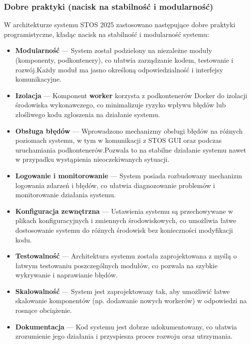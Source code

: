 \documentclass[12pt,a4paper]{article}
\begin{document}
\subsubsection{Dobre praktyki (nacisk na stabilność i modularność)}
W architekturze systemu STOS 2025 zastosowano następujące dobre praktyki programistyczne, kładąc nacisk na stabilność i modularność systemu:
\begin{itemize}
    \item \textbf{Modularność} --- System został podzielony na niezależne moduły (komponenty, podkontenery), co ułatwia zarządzanie kodem, testowanie i rozwój.\@ Każdy moduł ma jasno określoną odpowiedzialność i interfejsy komunikacyjne.
    \item \textbf{Izolacja} --- Komponent \textbf{worker} korzysta z podkontenerów Docker do izolacji środowiska wykonawczego, co minimalizuje ryzyko wpływu błędów lub złośliwego kodu zgłoszenia na działanie systemu.
    \item \textbf{Obsługa błędów} --- Wprowadzono mechanizmy obsługi błędów na różnych poziomach systemu, w tym w komunikacji z STOS GUI oraz podczas uruchamiania podkontenerów.\@ Pozwala to na stabilne działanie systemu nawet w przypadku wystąpienia nieoczekiwanych sytuacji.
    \item \textbf{Logowanie i monitorowanie} --- System posiada rozbudowany mechanizm logowania zdarzeń i błędów, co ułatwia diagnozowanie problemów i monitorowanie działania systemu.
    \item \textbf{Konfiguracja zewnętrzna} --- Ustawienia systemu są przechowywane w plikach konfiguracyjnych i zmiennych środowiskowych, co umożliwia łatwe dostosowanie systemu do różnych środowisk bez konieczności modyfikacji kodu.
    \item \textbf{Testowalność} --- Architektura systemu została zaprojektowana z myślą o łatwym testowaniu poszczególnych modułów, co pozwala na szybkie wykrywanie i naprawianie błędów.
    \item \textbf{Skalowalność} --- System jest zaprojektowany tak, aby umożliwić łatwe skalowanie komponentów (np. dodawanie nowych workerów) w odpowiedzi na rosnące obciążenie.
    \item \textbf{Dokumentacja} --- Kod systemu jest dobrze udokumentowany, co ułatwia zrozumienie jego działania i przyspiesza proces rozwoju oraz utrzymania.
\end{itemize}
\end{document}
